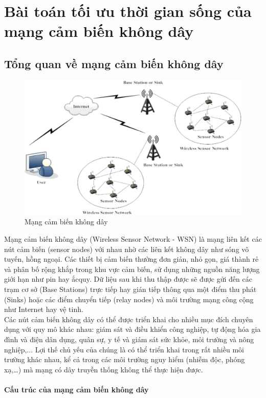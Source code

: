 \chapter{Bài toán tối ưu thời gian sống của mạng cảm biến không dây}

\section{Tổng quan về mạng cảm biến không dây}

\begin{figure}[h]
    \includegraphics[width=\linewidth]{picture/wsn.jpg}
    \caption{Mạng cảm biến không dây}
    \label{fig:pic1}
\end{figure}
Mạng cảm biến không dây (Wireless Sensor Network - WSN) là mạng liên
kết các nút cảm biến (sensor nodes) với nhau nhờ các liên kết không dây như sóng vô tuyến, hồng ngoại. Các thiết bị cảm biến thường đơn giản, nhỏ gọn, giá thành rẻ và phân bố rộng khắp trong khu vực cảm biến, sử dụng những nguồn năng lượng giới hạn như pin hay ắcquy. Dữ liệu sau khi thu thập được sẽ được gửi đến các trạm cơ sở (Base Stations) trực tiếp hay gián tiếp thông qua một điểm thu phát (Sinks) hoặc các điểm chuyển tiếp (relay nodes) và môi trường mạng công cộng như Internet hay vệ tinh. 
\\Các nút cảm biến không dây có thể được triển khai cho nhiều mục đích chuyên dụng với quy mô khác nhau: giám sát và điều khiển công nghiệp, tự động hóa gia đình và điện dân dụng, quân sự, y tế và giám sát sức khỏe, môi trường và nông nghiệp,... Lợi thế chủ yếu của chúng là có thể triển khai trong rất nhiều môi trường khác nhau, kể cả trong các môi trường nguy hiểm (nhiễm độc, phóng xạ,…) mà mạng có dây truyền thống không thể thực hiện được.
\\ \\\textbf{Cấu trúc của mạng cảm biến không dây}
